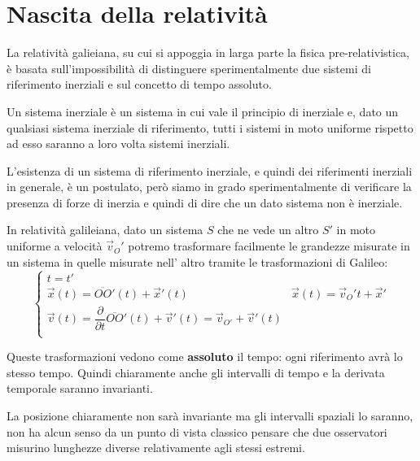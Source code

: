 \documentclass[12pt,a4paper,titlepage, twoside, openright]{book}
\renewcommand{\chaptermark}[1]{ \markboth{\chaptername \  \thechapter :\ #1}{} }
\renewcommand{\sectionmark}[1]{ \markright{#1}{} }
\renewcommand{\headrulewidth}{0.25pt}
\renewcommand{\footrulewidth}{0.3pt}
\renewcommand{\headrulewidth}{0pt}
\renewcommand{\footrulewidth}{0pt}
\numberwithin{equation}{chapter}
\begin{document}
\pagestyle{fancy}
\renewcommand{\chaptermark}[1]{ \markboth{\chaptername \  \thechapter :\ #1}{} } 
\renewcommand{\sectionmark}[1]{ \markright{#1}{} }
\chead[\leftmark]{} 
\fancyfoot[LO,RE]{\large\thepage} 
\fancyfoot[C]{\rightmark} 
\renewcommand{\headrulewidth}{0.5pt}
\renewcommand{\footrulewidth}{0.4pt}

\chapter{Nascita della relatività}

La relatività galieiana, su cui si appoggia in larga parte la fisica pre-relativistica, è basata sull'impossibilità di distinguere sperimentalmente due sistemi di riferimento inerziali e sul concetto di tempo assoluto.

Un sistema inerziale è un sistema in cui vale il principio di inerziale e, dato un qualsiasi sistema inerziale di riferimento, tutti i sistemi in moto uniforme rispetto ad esso saranno a loro volta sistemi inerziali.

L'esistenza di un sistema di riferimento inerziale, e quindi dei riferimenti inerziali in generale, è un postulato, però siamo in grado sperimentalmente di verificare la presenza di forze di inerzia e quindi di dire che un dato sistema non è inerziale.

In relatività galileiana, dato un sistema $S$ che ne vede un altro $S'$ in moto uniforme a velocità $\vec{v}_{O}'$ potremo trasformare facilmente le grandezze misurate in un sistema in quelle misurate nell' altro tramite le trasformazioni di Galileo:
\[
\begin{cases}
t=t'\\
\vec{x}(t)=\overline{OO}'(t)+\vec{x}'(t) & \vec{x}(t)=\vec{v}_{O}'t + \vec{x}' \\
\vec{v}(t)=\dfrac{\partial}{\partial t} \overline{OO}'(t) + \vec{v}'(t)=\vec{v}_{O'} + \vec{v}'(t) \\
\end{cases}
\]

Queste trasformazioni vedono come \textbf{assoluto} il tempo: ogni riferimento avrà lo stesso tempo. Quindi chiaramente anche gli intervalli di tempo e la derivata temporale saranno invarianti.

La posizione chiaramente non sarà invariante ma gli intervalli spaziali lo saranno, non ha alcun senso da un punto di vista classico pensare che due osservatori misurino lunghezze diverse relativamente agli stessi estremi.
\end{document}
